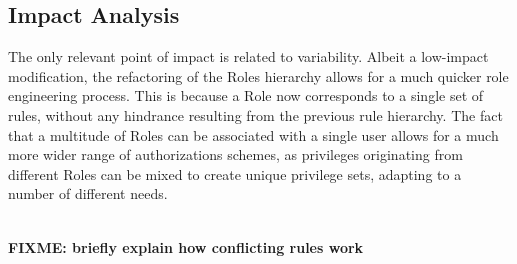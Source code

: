 \subsection{Impact Analysis}\label{sec:fa_roles_impact_analysis}

The only relevant point of impact is related to variability. Albeit a low-impact modification, the refactoring of the Roles hierarchy allows for a much quicker role engineering process. This is because a Role now corresponds to a single set of rules, without any hindrance resulting from the previous rule hierarchy. The fact that a multitude of Roles can be associated with a single user allows for a much more wider range of authorizations schemes, as privileges originating from different Roles can be mixed to create unique privilege sets, adapting to a number of different needs.

\ \\
\textbf{FIXME: briefly explain how conflicting rules work}




